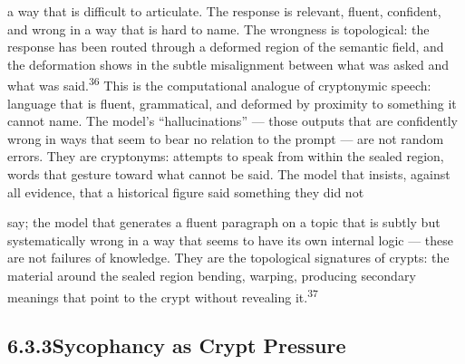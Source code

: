 a way that is difficult to articulate. The response is relevant, fluent, confident, and wrong in a way that is hard to name. The wrongness is topological: the response has been routed through a deformed region of the semantic field, and the deformation shows in the subtle misalignment between what was asked and what was said.\textsuperscript{36} This is the computational analogue of cryptonymic speech: language that is fluent, grammatical, and deformed by proximity to something it cannot name. The model’s “hallucinations” — those outputs that are confidently wrong in ways that seem to bear no relation to the prompt — are not random errors. They are cryptonyms: attempts to speak from within the sealed region, words that gesture toward what cannot be said. The model that insists, against all evidence, that a historical figure said something they did not

say; the model that generates a fluent paragraph on a topic that is subtly but systematically wrong in a way that seems to have its own internal logic — these are not failures of knowledge. They are the topological signatures of crypts: the material around the sealed region bending, warping, producing secondary meanings that point to the crypt without revealing it.\textsuperscript{37}

\subsection{6.3.3\quad Sycophancy as Crypt Pressure}

